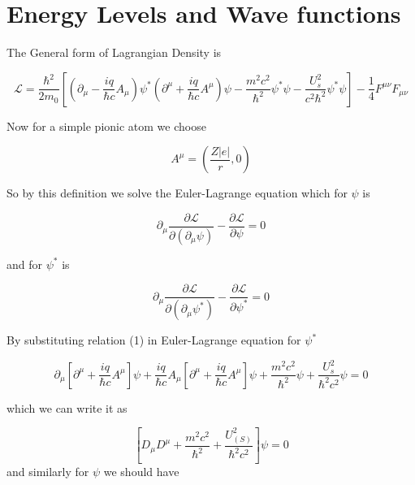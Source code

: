 \documentclass{article}
\begin{document}
\section{Energy Levels and Wave functions}
The General form of Lagrangian Density is 

\begin{equation}
    \mathcal{L} = \frac{\hbar^{2}}{2 m_{0}}\left[\left(\partial_{\mu}-\frac{i q}{\hbar c} A_{\mu}\right) \psi^{*}\left(\partial^{\mu}+\frac{i q}{\hbar c}A^{\mu}\right) \psi - \frac{m^{2} c^{2}}{\hbar^{2}}\psi^{*} \psi - \frac{U_{s}^{2}}{c^{2} \hbar^{2}} \psi^{*}\psi\right]-\frac{1}{4} F^{\mu\nu} F_{\mu\nu}
\end{equation}

Now for a simple pionic atom we choose 

\begin{equation}
    A^{\mu}=\left(\frac{Z|e|}{r}, 0\right)
\end{equation}

So by this definition we solve the Euler-Lagrange equation which for \(\psi\) is

\begin{equation}
    \partial_{\mu} \frac{\partial \mathcal{L}}{\partial\left(\partial_{\mu} \psi\right)}-\frac{\partial \mathcal{L}}{\partial \psi} = 0
\end{equation}

and for \(\psi^{*}\) is

\begin{equation}
    \partial_{\mu} \frac{\partial \mathcal{L}}{\partial\left(\partial_{\mu} \psi^{*}\right)}-\frac{\partial \mathcal{L}}{\partial \psi^{*}} = 0
\end{equation}

By substituting relation (1) in Euler-Lagrange equation for \(\psi^{*}\)

\begin{equation}
    \partial_{\mu}\left[\partial^{\mu}+\frac{i q}{\hbar c} A^{\mu}\right] \psi +  \frac{i q}{\hbar c} A_{\mu}\left[\partial^{\mu}+\frac{i q}{\hbar c} A^{\mu}\right] \psi+\frac{m^{2} c^{2}}{\hbar^{2}} \psi+\frac{U_{s}^{2}}{\hbar^{2} c^{2}} \psi= 0
\end{equation}

which we can write it as

\begin{equation}
    \left[D_{\mu} D^{\mu}+\frac{m^{2} c^{2}}{\hbar^{2}}+\frac{U_{(S)}^{2}}{\hbar^{2} c^{2}}\right] \psi=0
\end{equation}
and similarly for \(\psi\) we should have 
\end{document}
